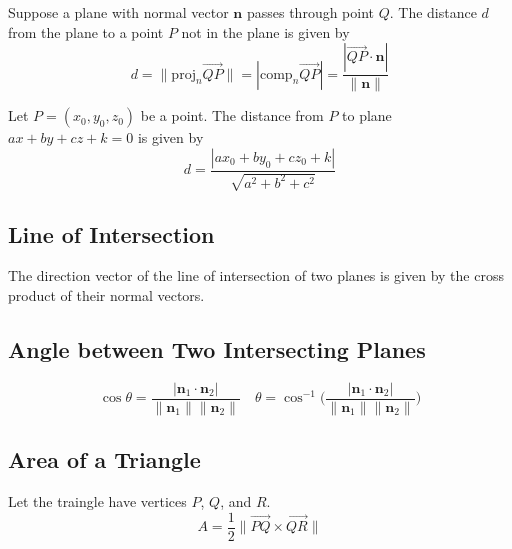 \documentclass{article}
\begin{document}
Suppose a plane with normal vector $\mathbf{n}$ passes through point $Q$. The distance $d$ from the plane to a point $P$ not in the plane is given by
\[d=\|\text{proj}_n\overrightarrow{QP}\|=|\text{comp}_n\overrightarrow{QP}|=\frac{|\overrightarrow{QP}\cdot\mathbf{n}|}{\|\mathbf{n}\|}\]

Let $P = (x_0, y_0, z_0)$ be a point. The distance from $P$ to plane $ax+by+cz+k=0$ is given by
\[d=\frac{|ax_0 + by_0 + cz_0 + k|}{\sqrt{a^2 + b^2 + c^2}}\]

\subsection*{Line of Intersection}

The direction vector of the line of intersection of two planes is given by the cross product of their normal vectors.

\subsection*{Angle between Two Intersecting Planes}

\[\cos\theta = \frac{|\mathbf{n}_1\cdot\mathbf{n}_2|}{\|\mathbf{n}_1\|\|\mathbf{n}_2\|}\quad \theta = \cos^{-1}\Bigg(\frac{|\mathbf{n}_1\cdot\mathbf{n}_2|}{\|\mathbf{n}_1\|\|\mathbf{n}_2\|}\Bigg)\]

\subsection*{Area of a Triangle}

Let the traingle have vertices $P$, $Q$, and $R$.
\[A=\frac{1}{2}\|\overrightarrow{PQ}\times\overrightarrow{QR}\|\]
\end{document}
